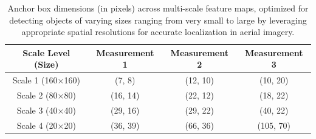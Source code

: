 \documentclass[preprint,review,12pt]{elsarticle}
\begin{document}
\begin{table}[htbp]  %
    \centering
    \begin{tabular}{|c|c|c|c|}
    \hline
    \textbf{Scale Level (Size)} & \textbf{Measurement 1} & \textbf{Measurement 2} & \textbf{Measurement 3} \\ \hline
    Scale 1 (160×160) & (7, 8) & (12, 10) & (10, 20) \\ \hline
    Scale 2 (80×80) & (16, 14) & (22, 12) & (18, 22) \\ \hline
    Scale 3 (40×40) & (29, 16) & (29, 22) & (40, 22) \\ \hline
    Scale 4 (20×20) & (36, 39) & (66, 36) & (105, 70) \\ \hline
    \end{tabular}
    \caption{Anchor box dimensions (in pixels) across multi-scale feature maps, optimized for detecting objects of varying sizes ranging from very small to large by leveraging appropriate spatial resolutions for accurate localization in aerial imagery.}
    \label{tab:measurements}
\end{table}
 
\end{document}
